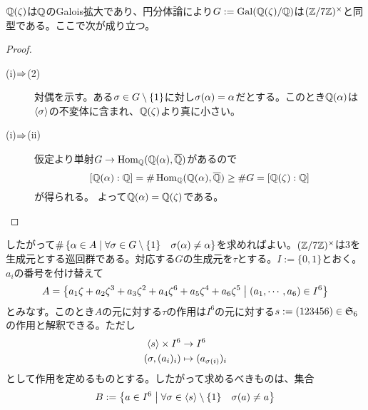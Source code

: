 \subsubsection{}%
\begin{sol}
  ${\mathbb Q}(\zeta)$は${\mathbb Q}$のGalois拡大であり、円分体論により$G:= \operatorname{Gal}({\mathbb Q}(\zeta)/ {\mathbb Q})$は$(\mathbb{Z} / 7 \mathbb{Z})^{\times}$と同型である。ここで次が成り立つ。

\begin{proof} ${}$
  \begin{description}
    \item[(i)$\Rightarrow$(2)] 対偶を示す。ある${\sigma} \in G \setminus \{ 1 \}$に対し${\sigma}({\alpha})= {\alpha}$だとする。このとき${\mathbb Q}({\alpha})$は$\langle {\sigma} \rangle$の不変体に含まれ、${\mathbb Q}(\zeta)$より真に小さい。
    \item[(i)$\Rightarrow$(ii)] 仮定より単射$G \to \operatorname{Hom}_{{\mathbb Q}}({\mathbb Q}({\alpha}), \overline{{\mathbb Q}})$があるので
\[
[{\mathbb Q}({\alpha}): {\mathbb Q}] = \# \operatorname{Hom}_{{\mathbb Q}}({\mathbb Q}({\alpha}), \overline{{\mathbb Q}}) \geq \# G = [{\mathbb Q}(\zeta):{\mathbb Q}]
\]
    が得られる。
    よって${\mathbb Q}({\alpha}) = {\mathbb Q}(\zeta)$である。
  \end{description}
\end{proof}
したがって$\# \left\{  {\alpha} \in A  \mathrel{} \middle| \mathrel{}  \forall {\sigma} \in G \setminus \{ 1 \} \quad {\sigma}({\alpha}) \neq {\alpha}  \right\}$を求めればよい。$(\mathbb{Z} / 7 \mathbb{Z})^{\times}$は$3$を生成元とする巡回群である。対応する$G$の生成元を$\tau$とする。$I := \{ 0,1\}$とおく。$a_i$の番号を付け替えて
\[
A = \left\{   a_1 \zeta +  a_2 \zeta^3 +  a_3 \zeta^2 + a_4 \zeta^6 + a_5 \zeta^4  + a_6 \zeta^5  \mathrel{} \middle| \mathrel{}  (a_1, \cdots , a_6) \in I^6  \right\}
\]
とみなす。このとき$A$の元に対する$\tau$の作用は$I^6$の元に対する$s := (123456) \in \mathfrak{S}_6$の作用と解釈できる。ただし
\begin{align*}
\langle s \rangle \times I^6 &\to I^6 \\
({\sigma}, (a_i)_i ) &\mapsto (a_{{\sigma}(i)})_i
\end{align*}
として作用を定めるものとする。したがって求めるべきものは、集合
\[
 B :=  \left\{  a \in I^6  \mathrel{} \middle| \mathrel{}  \forall {\sigma} \in \langle s \rangle \setminus \{ 1 \} \quad {\sigma}(a) \neq a    \right\}
\]
\end{sol}
